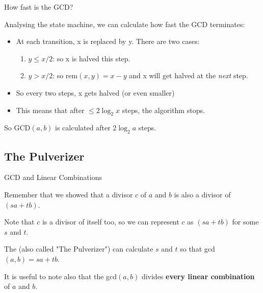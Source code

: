 \begin{frame}{How fast is the GCD?}

  Analysing the state machine, we can calculate how fast the GCD terminates:\bigskip

  \begin{itemize}
    \item At each transition, x is replaced by y. There are two cases:
      \begin{enumerate}
      \item $y \leq x/2$: so x is halved this step.\medskip
      \item $y > x/2$: so rem$(x,y) = x - y$ and x will get
        halved at the \emph{next} step.
      \end{enumerate}\bigskip
    \item So every two steps, x gets halved (or even smaller)
    \item This means that after $\leq 2\log_2x$ steps, the algorithm stops.
  \end{itemize}\bigskip

  So GCD$(a,b)$ is calculated after $2\log_2a$ steps.
\end{frame}


\subsection{The Pulverizer}
\begin{frame}{GCD and Linear Combinations}

  Remember that we showed that a divisor $c$ of $a$ and $b$ is also a divisor of $(sa+tb)$.\bigskip

  Note that $c$ is a divisor of itself too, so we can represent $c$ as $(sa+tb)$ for some $s$ and $t$.\bigskip

  The  (also called "The Pulverizer") can calculate $s$ and $t$ so that gcd$(a,b) = sa + tb$.\bigskip

  It is useful to note also that the gcd$(a,b)$ divides {\bf every linear combination} of $a$ and $b$.
\end{frame}

